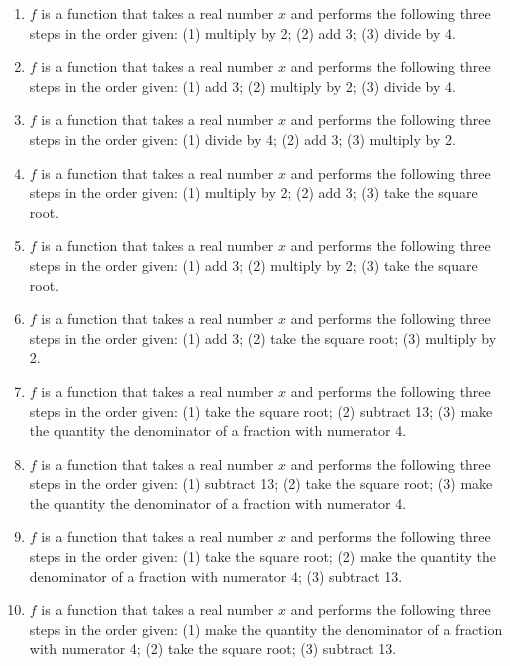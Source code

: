 \begin{enumerate}
\setcounter{enumi}{\value{HW}}

\item $f$ is a function that takes a real number $x$ and performs the following three steps in the order given: (1) multiply by 2; (2) add 3; (3) divide by 4. \label{buildfunctionfirst}

\item $f$ is a function that takes a real number $x$ and performs the following three steps in the order given: (1) add 3; (2) multiply by 2; (3) divide by 4. 

\item $f$ is a function that takes a real number $x$ and performs the following three steps in the order given: (1) divide by 4; (2) add 3; (3) multiply by 2.

\item $f$ is a function that takes a real number $x$ and performs the following three steps in the order given: (1) multiply by 2; (2) add 3; (3) take the square root.

\item $f$ is a function that takes a real number $x$ and performs the following three steps in the order given: (1) add 3; (2) multiply by 2; (3) take the square root.

\item $f$ is a function that takes a real number $x$ and performs the following three steps in the order given: (1) add 3; (2) take the square root; (3) multiply by 2.
\item $f$ is a function that takes a real number $x$ and performs the following three steps in the order given: (1) take the square root; (2) subtract 13; (3) make the quantity the denominator of a fraction with numerator 4. 

\item  $f$ is a function that takes a real number $x$ and performs the following three steps in the order given: (1) subtract 13; (2) take the square root; (3) make the quantity the denominator of a fraction with numerator 4.  

\item  $f$ is a function that takes a real number $x$ and performs the following three steps in the order given: (1) take the square root; (2) make the quantity the denominator of a fraction with numerator 4; (3) subtract 13. 

\item  $f$ is a function that takes a real number $x$ and performs the following three steps in the order given: (1) make the quantity the denominator of a fraction with numerator 4; (2) take the square root; (3) subtract 13. \label{buildfunctionlast}

\setcounter{HW}{\value{enumi}}
\end{enumerate}


